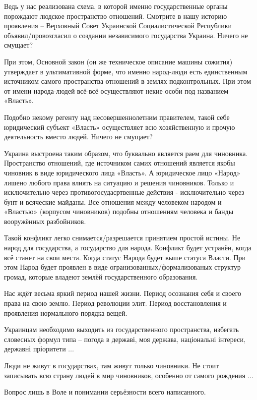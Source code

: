 Ведь у нас реализована схема, в которой именно государственные органы порождают
людское пространство отношений. Смотрите в нашу историю проявления – Верховный
Совет Украинской Социалистической Республики объявил/провозгласил о создании
независимого государства Украина. Ничего не смущает?

При этом, Основной закон (он же техническое описание машины сожития) утверждает
в ультимативной форме, что именно народ-люди есть единственным источником
самого пространства отношений в землях подконтрольных. При этом от имени
народа-людей всё-всё осуществляют некие особи под названием «Власть».

Подобно некому регенту над несовершеннолетним правителем, такой себе
юридический субъект «Власть» осуществляет всю хозяйственную и прочую
деятельность вместо людей. Ничего не смущает?

Украина выстроена таким образом, что буквально является раем для чиновника.
Пространство отношений, где источником самих отношений является якобы чиновник
в виде юридического лица «Власть». А юридическое лицо «Народ» лишено любого
права влиять на ситуацию и решения чиновников. Только и исключительно через
противогосудасртвенные действия - исключительно через бунт и всяческие майданы.
Все отношения между человеком-народом и «Властью» (корпусом чиновников) подобны
отношениям человека и банды вооружённых разбойников.

Такой конфликт легко снимается/разрешается принятием простой истины. Не народ
для государства, а государство для народа. Конфликт будет устранён, когда всё
станет на свои места. Когда статус Народа будет выше статуса Власти. При этом
Народ будет проявлен в виде огранизованных/формализованых структур громад,
которые владеют землёй государственного образования. 

Нас ждёт весьма яркий период нашей жизни. Период осознания себя и своего права
на свою землю. Период революции элит. Период восстановления и проявления
нормального порядка вещей.

Украинцам необходимо выходить из государственного пространства, избегать
словесных формул типа – погода в державі, моя держава, національні інтереси,
державні пріоритети ... 

Люди не живут в государствах, там живут только чиновники. Не стоит записывать
всю страну людей в мир чиновников, особенно от самого рождения ...

Вопрос лишь в Воле и понимании серьёзности всего написанного.
